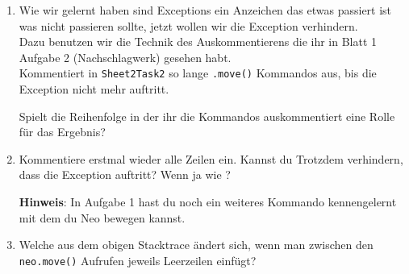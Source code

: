 \begin{enumerate}[label=\alph*)]
    \item Wie wir gelernt haben sind Exceptions ein Anzeichen das etwas passiert ist was nicht passieren sollte, jetzt wollen wir die Exception verhindern.\\
        Dazu benutzen wir die Technik des Auskommentierens die ihr in Blatt 1 Aufgabe 2 (Nachschlagwerk) gesehen habt.\\
        Kommentiert in \lstinline{Sheet2Task2} so lange \lstinline{.move()} Kommandos aus, bis die Exception nicht mehr auftritt.

        Spielt die Reihenfolge in der ihr die Kommandos auskommentiert eine Rolle für das Ergebnis?
    \item Kommentiere erstmal wieder alle Zeilen ein.
        Kannst du Trotzdem verhindern, dass die Exception auftritt?
        Wenn ja wie ?

    \textbf{Hinweis}: In Aufgabe 1 hast du noch ein weiteres Kommando kennengelernt mit dem du Neo bewegen kannst.
        
    \item \optional Welche  aus dem obigen Stacktrace ändert sich, wenn man zwischen den \lstinline{neo.move()} Aufrufen jeweils Leerzeilen einfügt?
\end{enumerate}
 

